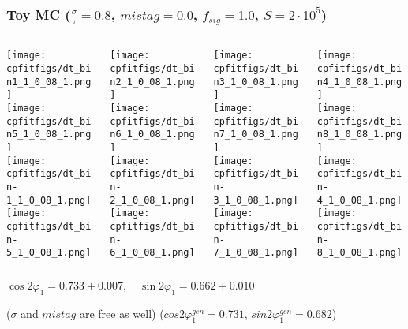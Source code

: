 \documentclass[10 pt,compress,mathserif]{beamer}
\begin{document}
\begin{frame}
 \frametitle{Toy MC ($\frac{\sigma}{\tau}=0.8$, $mistag = 0.0$, $f_{sig} = 1.0$, $S = 2\cdot10^5$)}
 \begin{columns}
  \begin{column}{0.25\textwidth}
   \texttt{[image: cpfitfigs/dt\_bin1\_1\_0\_08\_1.png]}\\
   \texttt{[image: cpfitfigs/dt\_bin5\_1\_0\_08\_1.png]}\\
   \texttt{[image: cpfitfigs/dt\_bin-1\_1\_0\_08\_1.png]}\\
   \texttt{[image: cpfitfigs/dt\_bin-5\_1\_0\_08\_1.png]}
  \end{column}
  \begin{column}{0.25\textwidth}
   \texttt{[image: cpfitfigs/dt\_bin2\_1\_0\_08\_1.png]}\\
   \texttt{[image: cpfitfigs/dt\_bin6\_1\_0\_08\_1.png]}\\
   \texttt{[image: cpfitfigs/dt\_bin-2\_1\_0\_08\_1.png]}\\
   \texttt{[image: cpfitfigs/dt\_bin-6\_1\_0\_08\_1.png]}
  \end{column}
  \begin{column}{0.25\textwidth}
   \texttt{[image: cpfitfigs/dt\_bin3\_1\_0\_08\_1.png]}\\
   \texttt{[image: cpfitfigs/dt\_bin7\_1\_0\_08\_1.png]}\\
   \texttt{[image: cpfitfigs/dt\_bin-3\_1\_0\_08\_1.png]}\\
   \texttt{[image: cpfitfigs/dt\_bin-7\_1\_0\_08\_1.png]}
  \end{column}
  \begin{column}{0.25\textwidth}
   \texttt{[image: cpfitfigs/dt\_bin4\_1\_0\_08\_1.png]}\\
   \texttt{[image: cpfitfigs/dt\_bin8\_1\_0\_08\_1.png]}\\
   \texttt{[image: cpfitfigs/dt\_bin-4\_1\_0\_08\_1.png]}\\
   \texttt{[image: cpfitfigs/dt\_bin-8\_1\_0\_08\_1.png]}
  \end{column}
 \end{columns}
 \begin{center}
  $\cos{2\varphi_1} = 0.733 \pm 0.007,\quad \sin{2\varphi_1} = 0.662 \pm 0.010$
  
  ($\sigma$ and $mistag$ are free as well)  ($cos2\varphi^{gen}_1 = 0.731$, $sin2\varphi^{gen}_1 = 0.682$)
 \end{center}
\end{frame}
\end{document}
